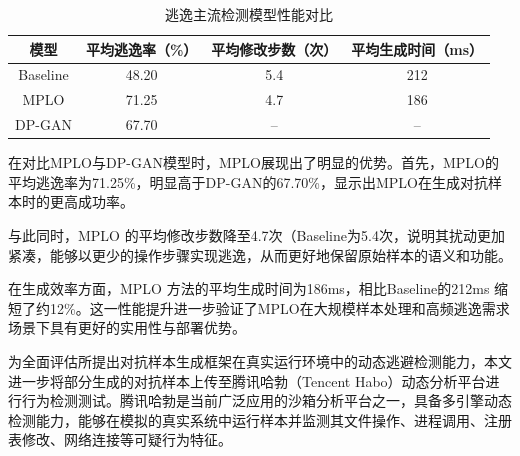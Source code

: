 \begin{table}[htbp]
	\centering
	\caption{逃逸主流检测模型性能对比}
	\label{tab:5.10}
	\begin{tabular*}{0.9\textwidth}{@{\extracolsep{\fill}}cccc}
		\toprule
		模型 & 平均逃逸率（\%） & 平均修改步数（次） & 平均生成时间（ms） \\
		\midrule
		Baseline & 48.20 & 5.4 & 212 \\
		MPLO & 71.25 & 4.7 & 186 \\
		DP-GAN & 67.70 & -- & -- \\
		\bottomrule
	\end{tabular*}
\end{table}

在对比MPLO与DP-GAN模型时，MPLO展现出了明显的优势。首先，MPLO的平均逃逸率为71.25\%，明显高于DP-GAN的67.70\%，显示出MPLO在生成对抗样本时的更高成功率。


与此同时，MPLO 的平均修改步数降至4.7次（Baseline为5.4次，说明其扰动更加紧凑，能够以更少的操作步骤实现逃逸，从而更好地保留原始样本的语义和功能。


在生成效率方面，MPLO 方法的平均生成时间为186ms，相比Baseline的212ms 缩短了约12\%。这一性能提升进一步验证了MPLO在大规模样本处理和高频逃逸需求场景下具有更好的实用性与部署优势。


为全面评估所提出对抗样本生成框架在真实运行环境中的动态逃避检测能力，本文进一步将部分生成的对抗样本上传至腾讯哈勃（Tencent Habo）动态分析平台进行行为检测测试。腾讯哈勃是当前广泛应用的沙箱分析平台之一，具备多引擎动态检测能力，能够在模拟的真实系统中运行样本并监测其文件操作、进程调用、注册表修改、网络连接等可疑行为特征。

